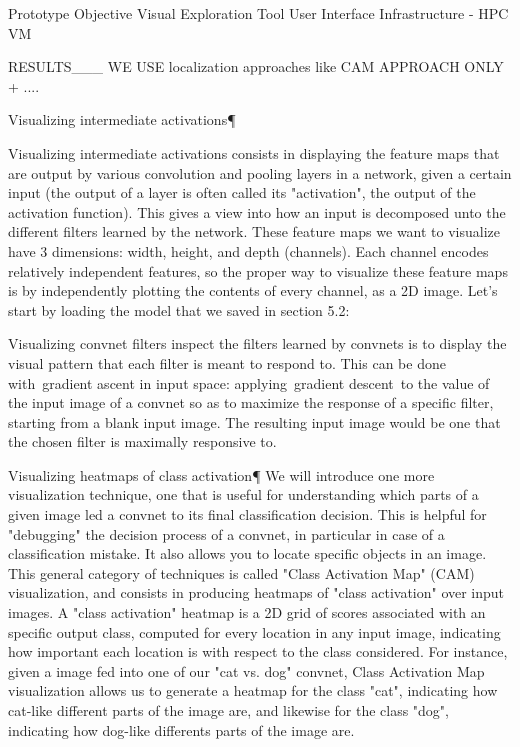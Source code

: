 Prototype Objective
Visual Exploration Tool
User Interface
Infrastructure - HPC VM

RESULTS___
WE USE localization approaches like CAM APPROACH ONLY + ....

Visualizing intermediate activations¶

Visualizing intermediate activations consists in displaying the feature maps that are output by various convolution and pooling layers in a network, given a certain input (the output of a layer is often called its "activation", the output of the activation function). This gives a view into how an input is decomposed unto the different filters learned by the network. These feature maps we want to visualize have 3 dimensions: width, height, and depth (channels). Each channel encodes relatively independent features, so the proper way to visualize these feature maps is by independently plotting the contents of every channel, as a 2D image. Let's start by loading the model that we saved in section 5.2:

Visualizing convnet filters
inspect the filters learned by convnets is to display the visual pattern that each filter is meant to respond to. This can be done with gradient ascent in input space: applying gradient descent to the value of the input image of a convnet so as to maximize the response of a specific filter, starting from a blank input image. The resulting input image would be one that the chosen filter is maximally responsive to.

Visualizing heatmaps of class activation¶
We will introduce one more visualization technique, one that is useful for understanding which parts of a given image led a convnet to its final classification decision. This is helpful for "debugging" the decision process of a convnet, in particular in case of a classification mistake. It also allows you to locate specific objects in an image.
This general category of techniques is called "Class Activation Map" (CAM) visualization, and consists in producing heatmaps of "class activation" over input images. A "class activation" heatmap is a 2D grid of scores associated with an specific output class, computed for every location in any input image, indicating how important each location is with respect to the class considered. For instance, given a image fed into one of our "cat vs. dog" convnet, Class Activation Map visualization allows us to generate a heatmap for the class "cat", indicating how cat-like different parts of the image are, and likewise for the class "dog", indicating how dog-like differents parts of the image are.